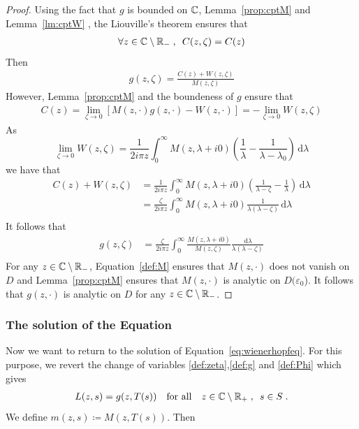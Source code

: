 \documentclass[11pt]{amsart}
\newcommand{\diff}{\,\mathrm{d}}
\begin{document}
\begin{proof}
Using the fact that $g$ is bounded on $\mathbb{C}$, Lemma~\ref{prop:cptM} and Lemma~\ref{lm:cptW}
, the Liouville's theorem ensures that
\begin{align*}
    \forall z \in \mathbb{C} \setminus \mathbb{R}_-
    \; , \enspace
    C(z,\zeta) = C(z)
\end{align*}
Then 
\begin{align}
    g(z,\zeta) = \frac{C(z)+W(z,\zeta)}{M(z,\zeta)}
\end{align}
However, Lemma~\ref{prop:cptM} and the boundeness of $g$ ensure that
\begin{align}
C(z) 
= \lim_{\zeta \to 0}[M(z,\cdot)g(z,\cdot) - W(z,\cdot)] 
= -\lim_{\zeta \to 0}W(z,\zeta)
\end{align}
As
$$ \lim_{\zeta \to 0}W(z,\zeta) 
= \frac{1}{2i\pi z}\int_0^\infty  {M(z,\lambda+i0)}\left( \frac{1}{\lambda} - \frac{1}{\lambda-\lambda_0}\right) \diff \lambda $$
we have that
\begin{align*}
    C(z) + W(z,\zeta)
    &= 
    \frac{1}{2i \pi z}\int_0^\infty  {M(z,\lambda+i0)}\left( \frac{1}{\lambda-\zeta}-\frac{1}{\lambda}\right) \diff \lambda \\
    &= 
    \frac{\zeta}{2i\pi z}\int_0^\infty  {M(z,\lambda+i0)}\frac{1}{\lambda(\lambda-\zeta)} \diff \lambda \\
\end{align*}
It follows that 
\begin{align*}
    g(z,\zeta) 
    &= 
    \frac{\zeta}{2i \pi z}\int_0^\infty  \frac{M(z,\lambda+i0)}{M(z,\zeta)} \frac{\diff \lambda}{\lambda(\lambda-\zeta)} \\
\end{align*}
For any $z \in \mathbb{C} \setminus \mathbb{R}_-$, Equation~\eqref{def:M} ensures that $M(z, \cdot)$ does not vanish on $D$ and Lemma~\ref{prop:cptM} ensures that $M(z, \cdot)$ is analytic on $D(\varepsilon_0$). It follows that $g(z, \cdot)$ is analytic on $D$ for any $z \in \mathbb{C} \setminus \mathbb{R}_-$.

\end{proof}

\subsubsection{The solution of the Equation}
Now we want to return to the solution of Equation~\eqref{eq:wienerhopfeq}. For this purpose, we revert the change of variables \eqref{def:zeta},\eqref{def:g} and \eqref{def:Phi} which gives
\begin{align}
    L(z,s) = g(z, T(s)) \quad \text{for all} \quad z \in \mathbb{C} \setminus \mathbb{R}_+ \; , \enspace s \in S 
    \; .
\end{align}
We define $m(z,s) \coloneqq M(z, T(s))$. Then
\end{document}
